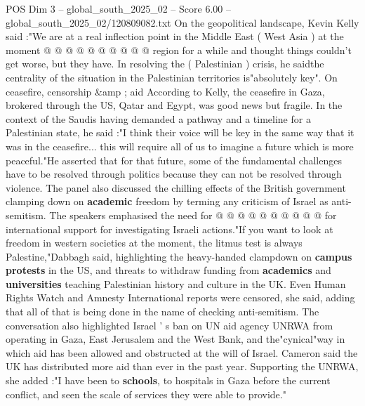 \begin{textsample}{POS Dim 3 – global\_south\_2025\_02 – Score 6.00 – global\_south\_2025\_02/120809082.txt}
On the geopolitical landscape, Kevin Kelly said :"We are at a real inflection point in the Middle East ( West Asia ) at the moment @ @ @ @ @ @ @ @ @ @ region for a while and thought things couldn't get worse, but they have.
In resolving the ( Palestinian ) crisis, he saidthe centrality of the situation in the Palestinian territories is"absolutely key".
On ceasefire, censorship \&amp ; aid According to Kelly, the ceasefire in Gaza, brokered through the US, Qatar and Egypt, was good news but fragile.
In the context of the Saudis having demanded a pathway and a timeline for a Palestinian state, he said :"I think their voice will be key in the same way that it was in the ceasefire... this will require all of us to imagine a future which is more peaceful."He asserted that for that future, some of the fundamental challenges have to be resolved through politics because they can not be resolved through violence.
The panel also discussed the chilling effects of the British government clamping down on \textbf{academic} freedom by terming any criticism of Israel as anti-semitism.
The speakers emphasised the need for @ @ @ @ @ @ @ @ @ @ for international support for investigating Israeli actions."If you want to look at freedom in western societies at the moment, the litmus test is always Palestine,"Dabbagh said, highlighting the heavy-handed clampdown on \textbf{campus} \textbf{protests} in the US, and threats to withdraw funding from \textbf{academics} and \textbf{universities} teaching Palestinian history and culture in the UK.
Even Human Rights Watch and Amnesty International reports were censored, she said, adding that all of that is being done in the name of checking anti-semitism.
The conversation also highlighted Israel ' s ban on UN aid agency UNRWA from operating in Gaza, East Jerusalem and the West Bank, and the"cynical"way in which aid has been allowed and obstructed at the will of Israel.
Cameron said the UK has distributed more aid than ever in the past year.
Supporting the UNRWA, she added :"I have been to \textbf{schools}, to hospitals in Gaza before the current conflict, and seen the scale of services they were able to provide."

\end{textsample}
